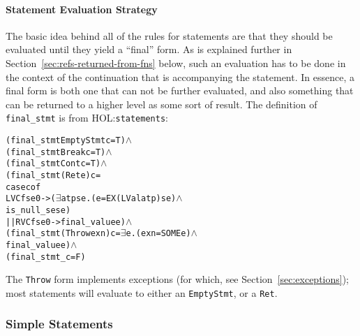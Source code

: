 \documentclass[11pt]{article}
\newcommand{\HOLfile}[1]{HOL:\texttt{#1}}
\begin{document}
\paragraph{Statement Evaluation Strategy}
The basic idea behind all of the rules for statements are that they
should be evaluated until they yield a ``final'' form.  As is
explained further in Section~\ref{sec:refs-returned-from-fns} below,
such an evaluation has to be done in the context of the continuation
that is accompanying the statement.  In essence, a final form is both
one that can not be further evaluated, and also something that can be
returned to a higher level as some sort of result.  The definition of
\texttt{final_stmt} is from \HOLfile{statements}:
%
%
\begin{alltt}
  (final_stmt EmptyStmt c = T) \(\land\)
  (final_stmt Break c = T) \(\land\)
  (final_stmt Cont c = T) \(\land\)
  (final_stmt (Ret e) c =
     case c of
        LVC f se0 -> (\(\exists\)a t p se. (e = EX (LVal a t p) se) \(\land\)
                                 is_null_se se)
     || RVC f se0 -> final_value e) \(\land\)
  (final_stmt (Throw exn) c = \(\exists\)e. (exn = SOME e) \(\land\)
                                  final_value e) \(\land\)
  (final_stmt _ c = F)
\end{alltt}
%
%
%
The \texttt{Throw} form implements exceptions (for which, see
Section~\ref{sec:exceptions}); most statements will evaluate to either
an \texttt{EmptyStmt}, or a \texttt{Ret}.

\subsubsection{Simple Statements}
\label{sec:simple-statements}
\end{document}
